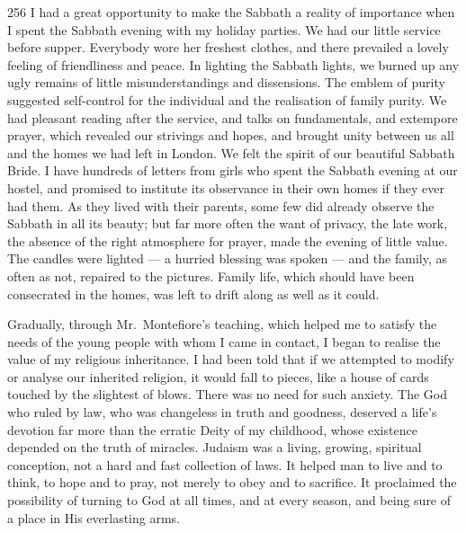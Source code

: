 \begin{tp}{256}
I had a great opportunity to make the Sabbath a
reality of importance when I spent the Sabbath evening
with my holiday parties. We had our little service
before supper. Everybody wore her freshest clothes,
and there prevailed a lovely feeling of friendliness and
peace. In lighting the Sabbath lights, we burned up
any ugly remains of little misunderstandings and
dissensions. The emblem of purity suggested self-control
for the individual and the realisation of family purity.
We had pleasant reading after the service, and talks on
fundamentals, and extempore prayer, which revealed
our strivings and hopes, and brought unity between us
all and the homes we had left in London. We felt the
spirit of our beautiful Sabbath Bride. I have hundreds
of letters from girls who spent the Sabbath evening at
our hostel, and promised to institute its observance in
their own homes if they ever had them. As they lived
with their parents, some few did already observe the
Sabbath in all its beauty; but far more often the want
of privacy, the late work, the absence of the right
atmosphere for prayer, made the evening of little value.
The candles were lighted — a hurried blessing was spoken
— and the family, as often as not, repaired to the pictures.
Family life, which should have been consecrated in the
homes, was left to drift along as well as it could.
\end{tp}

Gradually, through Mr.\ Montefiore’s teaching,
which helped me to satisfy the needs of the young people
with whom I came in contact, I began to realise the value
of my religious inheritance. I had been told that if we
attempted to modify or analyse our inherited religion,
it would fall to pieces, like a house of cards touched
by the slightest of blows. There was no need for such
anxiety. The God who ruled by law, who was changeless
in truth and goodness, deserved a life’s devotion far more
than the erratic Deity of my childhood, whose existence
depended on the truth of miracles. Judaism was a
living, growing, spiritual conception, not a hard and
fast collection of laws. It helped man to live and to
think, to hope and to pray, not merely to obey and to
sacrifice. It proclaimed the possibility of turning to God
at all times, and at every season, and being sure of a
place in His everlasting arms.

